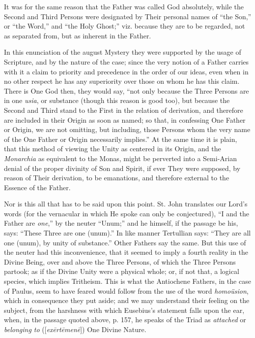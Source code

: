 It was for the same reason that the Father was called God
absolutely, while the Second and Third Persons were designated by
Their personal names of ``the Son,'' or ``the Word,''
and ``the Holy Ghost;'' viz. because they are to be regarded,
not as separated from, but as inherent in the Father.

In this enunciation of the august Mystery they were supported by
the usage of Scripture, and by the nature of the case; since the very
notion of a Father carries with it a claim to priority and precedence
in the order of our ideas, even when in no other respect he has any
superiority over those on whom he has this claim. There is One God
then, they would say, ``not only because the Three Persons are in
one \emph{usia}, or substance (though this reason is good too), but
because the Second and Third stand to the First in the relation of
derivation, and therefore are included in their Origin as soon as
named; so that, in confessing One Father or Origin, we are not
omitting, but including, those Persons whom the very name of the One
Father or Origin necessarily implies.'' At the same time it is plain,
that this method of viewing the Unity as centered in its Origin, and
the \emph{Monarchia} as equivalent to the Monas, might be perverted
into a Semi-Arian denial of the proper divinity of Son and Spirit, if
ever They were supposed, by reason of Their derivation, to be
emanations, and therefore external to the Essence of the Father.

Nor is this all that has to be said upon this point. St. John
translates our Lord's words (for the vernacular in which He spoke can
only be conjectured), ``I and the Father are \emph{one},'' by
the neuter ``Unum;'' and he himself, if the passage be his,
says: ``These Three are one (unum).'' In like manner
Tertullian says: ``They are all one (unum), by unity of
substance.'' Other Fathers say the same. But this use of the
neuter had this inconvenience, that it seemed to imply a fourth
reality in the Divine Being, over and above the Three Persons, of
which the Three Persons partook; as if the Divine Unity were a
physical whole; or, if not that, a logical species, which implies
Tritheism. This is what the Antiochene Fathers, in the case of Paulus,
seem to have feared would follow from the use of the word \emph{homoüsion},
which in consequence they put aside; and we may understand their
feeling on the subject, from the harshness with which Eusebius's
statement falls upon the ear, when, in the passage quoted above, p.
157, he speaks of the Triad as \emph{attached} or \emph{belonging to}
([\emph{ex\={e}rt\={e}men\={e}}]) One Divine Nature.

